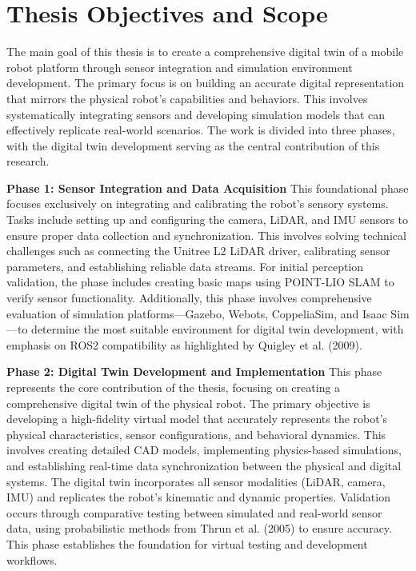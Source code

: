 \section{Thesis Objectives and Scope}

The main goal of this thesis is to create a comprehensive digital twin of a mobile
robot platform through sensor integration and simulation environment development.
The primary focus is on building an accurate digital representation that mirrors
the physical robot's capabilities and behaviors. This involves systematically
integrating sensors and developing simulation models that can effectively replicate
real-world scenarios. The work is divided into three phases, with the digital twin
development serving as the central contribution of this research.

\textbf{Phase 1: Sensor Integration and Data Acquisition}
This foundational phase focuses exclusively on integrating and calibrating the
robot's sensory systems. Tasks include setting up and configuring the camera,
LiDAR, and IMU sensors to ensure proper data collection and synchronization.
This involves solving technical challenges such as connecting the Unitree L2 LiDAR
driver, calibrating sensor parameters, and establishing reliable data streams.
For initial perception validation, the phase includes creating basic maps using
POINT-LIO SLAM to verify sensor functionality. Additionally, this phase involves
comprehensive evaluation of simulation platforms—Gazebo, Webots, CoppeliaSim, and
Isaac Sim—to determine the most suitable environment for digital twin development,
with emphasis on ROS2 compatibility as highlighted by Quigley et al. (2009).

\textbf{Phase 2: Digital Twin Development and Implementation}
This phase represents the core contribution of the thesis, focusing on creating
a comprehensive digital twin of the physical robot. The primary objective is
developing a high-fidelity virtual model that accurately represents the robot's
physical characteristics, sensor configurations, and behavioral dynamics. This
involves creating detailed CAD models, implementing physics-based simulations,
and establishing real-time data synchronization between the physical and digital
systems. The digital twin incorporates all sensor modalities (LiDAR, camera, IMU)
and replicates the robot's kinematic and dynamic properties. Validation occurs
through comparative testing between simulated and real-world sensor data, using
probabilistic methods from Thrun et al. (2005) to ensure accuracy. This phase
establishes the foundation for virtual testing and development workflows.

